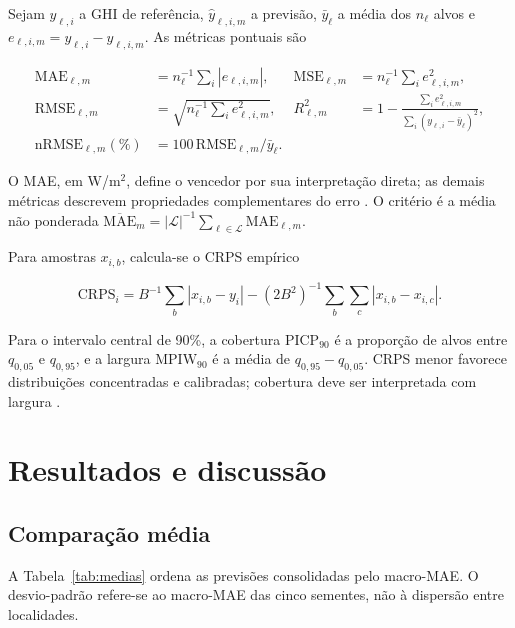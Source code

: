 \documentclass[12pt,a4paper,fleqn]{article}
\begin{document}
Sejam $y_{\ell,i}$ a GHI de referência, $\widehat y_{\ell,i,m}$ a previsão, $\bar y_\ell$ a média dos $n_\ell$ alvos e $e_{\ell,i,m}=y_{\ell,i}-\widehat y_{\ell,i,m}$. As métricas pontuais são

\begin{equation}
\begin{aligned}
 \mathrm{MAE}_{\ell,m}&=n_\ell^{-1}\sum_i|e_{\ell,i,m}|,&
 \mathrm{MSE}_{\ell,m}&=n_\ell^{-1}\sum_i e_{\ell,i,m}^2,\\
 \mathrm{RMSE}_{\ell,m}&=\sqrt{n_\ell^{-1}\sum_i e_{\ell,i,m}^2},&
 R^2_{\ell,m}&=1-\frac{\sum_i e_{\ell,i,m}^2}{\sum_i(y_{\ell,i}-\bar y_\ell)^2},\\
 \mathrm{nRMSE}_{\ell,m}(\%)&=100\,\mathrm{RMSE}_{\ell,m}/\bar y_\ell.&
\end{aligned}
\label{eq:metricas}
\end{equation}

O MAE, em W/m$^2$, define o vencedor por sua interpretação direta; as demais métricas descrevem propriedades complementares do erro \citep{hyndman2006}. O critério é a média não ponderada $\overline{\mathrm{MAE}}_m=|\mathcal L|^{-1}\sum_{\ell\in\mathcal L}\mathrm{MAE}_{\ell,m}$.

Para amostras $x_{i,b}$, calcula-se o CRPS empírico

\begin{equation}
 \mathrm{CRPS}_i=B^{-1}\sum_b|x_{i,b}-y_i|-(2B^2)^{-1}\sum_b\sum_c|x_{i,b}-x_{i,c}|.
 \label{eq:crps}
\end{equation}

Para o intervalo central de 90\%, a cobertura $\mathrm{PICP}_{90}$ é a proporção de alvos entre $q_{0,05}$ e $q_{0,95}$, e a largura $\mathrm{MPIW}_{90}$ é a média de $q_{0,95}-q_{0,05}$. CRPS menor favorece distribuições concentradas e calibradas; cobertura deve ser interpretada com largura \citep{gneiting2007}.

\section{Resultados e discussão}
\label{sec:resultados}

\subsection{Comparação média}

A Tabela~\ref{tab:medias} ordena as previsões consolidadas pelo macro-MAE. O desvio-padrão refere-se ao macro-MAE das cinco sementes, não à dispersão entre localidades.
\end{document}
